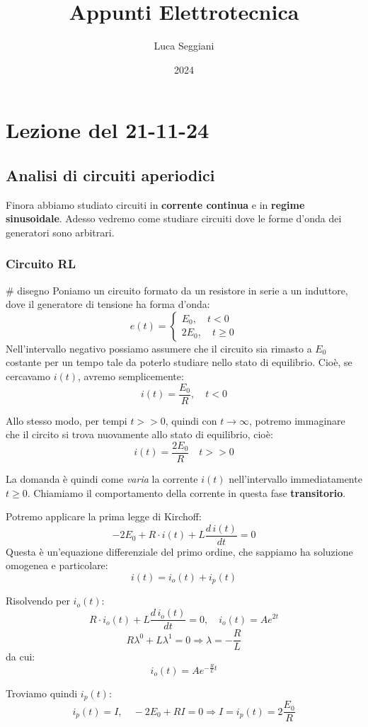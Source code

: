 \documentclass[a4paper,11pt]{article}
\title{Appunti Elettrotecnica}
\author{Luca Seggiani}
\date{2024}
\begin{document}
\section{Lezione del 21-11-24}

\thispagestyle{empty}
\pagestyle{fancy}

\subsection{Analisi di circuiti aperiodici}
Finora abbiamo studiato circuiti in \textbf{corrente continua} e in \textbf{regime sinusoidale}.
Adesso vedremo come studiare circuiti dove le forme d'onda dei generatori sono arbitrari.

\subsubsection{Circuito RL}
# disegno
Poniamo un circuito formato da un resistore in serie a un induttore, dove il generatore di tensione ha forma d'onda:
\[
	e(t) =
	\begin{cases}
		E_0, \quad t < 0 \\ 
		2E_0, \quad t \geq 0
	\end{cases}
\]
Nell'intervallo negativo possiamo assumere che il circuito sia rimasto a $E_0$ costante per un tempo tale da poterlo studiare nello stato di equilibrio.
Cioè, se cercavamo $i(t)$, avremo semplicemente:
$$
i(t) = \frac{E_0}{R}, \quad t < 0
$$

Allo stesso modo, per tempi $t >> 0$, quindi con $t \rightarrow \infty$, potremo immaginare che il circito si trova nuovamente allo stato di equilibrio, cioè:
$$
i(t) = \frac{2 E_0}{R} \quad t >> 0
$$

La domanda è quindi come \textit{varia} la corrente $i(t)$ nell'intervallo immediatamente $t \geq 0$.
Chiamiamo il comportamento della corrente in questa fase \textbf{transitorio}.

Potremo applicare la prima legge di Kirchoff:
$$
-2 E_0 + R \cdot i(t) + L \frac{d \, i(t)}{dt} = 0
$$
Questa è un'equazione differenziale del primo ordine, che sappiamo ha soluzione omogenea e particolare:
$$
i(t) = i_o(t) + i_p(t)
$$

Risolvendo per $i_o(t)$:
$$
R \cdot i_o(t) + L \frac{d \, i_o(t)}{dt} = 0, \quad i_o(t) = Ae^{2t}
$$
$$
R \lambda^0 + L \lambda^1 = 0 \Rightarrow \lambda = -\frac{R}{L}
$$
da cui:
$$
i_o(t) = Ae^{-\frac{R}{L}t}
$$

Troviamo quindi $i_p(t)$:
$$
i_p(t) = I, \quad -2 E_0 + RI = 0 \Rightarrow I = i_p(t) = 2 \frac{E_0}{R}
$$
\end{document}
